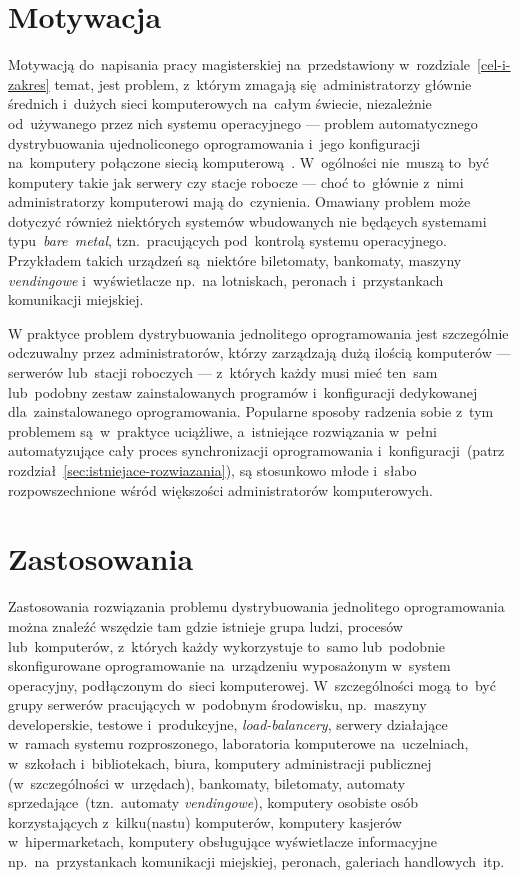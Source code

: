 \documentclass[thesis]{subfiles}
\begin{document}

\section{Motywacja}

Motywacją do~napisania pracy magisterskiej na~przedstawiony w~rozdziale~\ref{cel-i-zakres} temat, jest problem, z~którym zmagają się~administratorzy głównie średnich i~dużych sieci komputerowych na~całym świecie, niezależnie od~używanego przez nich systemu operacyjnego --- problem automatycznego dystrybuowania ujednoliconego oprogramowania i~jego konfiguracji na~komputery połączone siecią komputerową~\cite{so-problem-intro}. W~ogólności nie~muszą to~być komputery takie jak serwery czy stacje robocze --- choć to~głównie z~nimi administratorzy komputerowi mają do~czynienia. Omawiany problem może dotyczyć również niektórych systemów wbudowanych nie będących systemami typu~\mbox{\emph{bare~metal}}, tzn.~pracujących pod~kontrolą systemu operacyjnego. Przykładem takich urządzeń są~niektóre biletomaty, bankomaty, maszyny \emph{vendingowe} i~wyświetlacze np.~na lotniskach, peronach i~przystankach komunikacji miejskiej.

W praktyce problem dystrybuowania jednolitego oprogramowania jest szczególnie odczuwalny przez administratorów, którzy zarządzają dużą ilością komputerów --- serwerów lub~stacji roboczych --- z~których każdy musi mieć ten~sam lub~podobny zestaw zainstalowanych programów i~konfiguracji dedykowanej dla~zainstalowanego oprogramowania. Popularne sposoby radzenia sobie z~tym problemem są~w~praktyce uciążliwe, a~istniejące rozwiązania w~pełni automatyzujące cały proces synchronizacji oprogramowania i~konfiguracji~(patrz rozdział~\ref{sec:istniejace-rozwiazania}), są stosunkowo młode i~słabo rozpowszechnione wśród większości administratorów komputerowych.


\section{Zastosowania}

Zastosowania rozwiązania problemu dystrybuowania jednolitego oprogramowania można znaleźć wszędzie tam gdzie istnieje grupa ludzi, procesów lub~komputerów, z~których każdy wykorzystuje to~samo lub~podobnie skonfigurowane oprogramowanie na~urządzeniu wyposażonym w~system operacyjny, podłączonym do~sieci komputerowej. W~szczególności mogą to~być grupy serwerów pracujących w~podobnym środowisku, np.~maszyny developerskie, testowe i~produkcyjne, \emph{load-balancery}, serwery działające w~ramach systemu rozproszonego, laboratoria komputerowe na~uczelniach, w~szkołach i~bibliotekach, biura, komputery administracji publicznej (w~szczególności w~urzędach), bankomaty, biletomaty, automaty sprzedające~(tzn.~automaty \emph{vendingowe}), komputery osobiste osób korzystających z~kilku(nastu) komputerów, komputery kasjerów w~hipermarketach, komputery obsługujące wyświetlacze informacyjne np.~na~przystankach komunikacji miejskiej, peronach, galeriach handlowych~itp.
\end{document}
